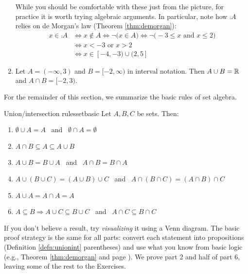 \begin{examples}{}{}
\begin{enumerate}
\begin{minipage}[t]{0.69\linewidth}
		\end{minipage}
		\smallbreak
		While you should be comfortable with these just from the picture, for practice it is worth trying algebraic arguments. In particular, note how $\comp A$ relies on de Morgan's law (Theorem \ref{thm:demorgan}):
		\begin{align*}
			x\in \comp A&\iff x\notin A\iff \neg\bigl(x\in A\bigr) \iff\neg\bigl(-3\le x \text{ and }x\le 2\bigr)\\
			&\iff x<-3\text{ or }x>2 \tag{de Morgan}\\
			&\iff x\in[-4,-3)\cup (2,5] \tag{remember that $x\in\cU$ always!}
		\end{align*}
		
		\item Let $A=(-\infty,3)$ and $B=[-2,\infty)$ in interval notation. Then $A\cup B=\mathbb{R}$ and $A\cap B=[-2,3)$.
	\end{enumerate}
\end{examples}


For the remainder of this section, we summarize the basic rules of set algebra.

\begin{thm}{Union/intersection rules}{setbasic}
	Let $A,B,C$ be sets. Then:
	\begin{enumerate}\itemsep2pt
		\item $\emptyset\cup A=A$ \ and \ $\emptyset\cap A=\emptyset$
		\item $A\cap B\subseteq A\subseteq A\cup B$
		\item $A\cup B=B\cup A$ \ and \ $A\cap B=B\cap A$
		\item $A\cup (B\cup C)=(A\cup B)\cup C$ \ and \ $A\cap (B\cap C)=(A\cap B)\cap C$
		\item $A\cup A=A\cap A=A$
		\item $A\subseteq B\Longrightarrow A\cup C\subseteq B\cup C$ \ and \ $A\cap C\subseteq B\cap C$
	\end{enumerate}
\end{thm}

If you don't believe a result, try \emph{visualizing} it using a Venn diagram. The basic proof strategy is the same for all parts: convert each statement into propositions (Definition \ref{defn:unionint} parentheses) and use what you know from basic logic (e.g., Theorem \ref{thm:demorgan} and page \pageref{pg:asidelogicalgebra}). We prove part 2 and half of part 6, leaving some of the rest to the Exercises.

